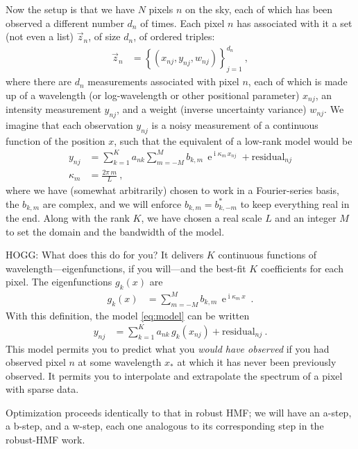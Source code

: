 \documentclass{article}
\DeclareMathOperator{\ee}{e}
\DeclareMathOperator{\ii}{i}
\begin{document}
Now the setup is that we have $N$ pixels $n$ on the sky, each of which has been observed a different number $d_n$ of times.
Each pixel $n$ has associated with it a set (not even a list) $\vec{z}_n$, of size $d_n$, of ordered triples:
\begin{align}
    \vec{z}_n &= \left\{ (x_{nj}, y_{nj}, w_{nj}) \right\}_{j=1}^{d_n} ~,
\end{align}
where there are $d_n$ measurements associated with pixel $n$,
each of which is made up of a wavelength (or log-wavelength or other positional parameter) $x_{nj}$, an intensity measurement $y_{nj}$, and a weight (inverse uncertainty variance) $w_{nj}$.
We imagine that each observation $y_{nj}$ is a noisy measurement of a continuous function of the position $x$, such that the equivalent of a low-rank model would be
\begin{align}
    y_{nj} &= \sum_{k=1}^K a_{nk} \sum_{m=-M}^M b_{k,m}\,\ee^{\ii \kappa_m\,x_{nj}} + \text{residual}_{nj} \label{eq:model}\\
    \kappa_m &= \frac{2\pi\,m}{L} ~,
\end{align}
where we have (somewhat arbitrarily) chosen to work in a Fourier-series basis,
the $b_{k,m}$ are complex,
and we will enforce $b_{k,m}=b_{k,-m}^\ast$ to keep everything real in the end.
Along with the rank $K$, we have chosen a real scale $L$ and an integer $M$ to set the domain and the bandwidth of the model.

HOGG: What does this do for you?
It delivers $K$ continuous functions of wavelength---eigenfunctions, if you will---and the best-fit $K$ coefficients for each pixel.
The eigenfunctions $g_k(x)$ are
\begin{align}
    g_k(x) &= \sum_{m=-M}^M b_{k,m}\,\ee^{\ii \kappa_m\,x} ~.
\end{align}
With this definition, the model \eqref{eq:model} can be written
\begin{align}
    y_{nj} &= \sum_{k=1}^K a_{nk}\,g_k(x_{nj}) + \text{residual}_{nj} ~.
\end{align}
This model permits you to predict what you \emph{would have observed} if you had observed pixel $n$ at some wavelength $x_\ast$ at which it has never been previously observed.
It permits you to interpolate and extrapolate the spectrum of a pixel with sparse data.

Optimization proceeds identically to that in robust HMF; we will have an a-step, a b-step, and a w-step, each one analogous to its corresponding step in the robust-HMF work.
\end{document}
